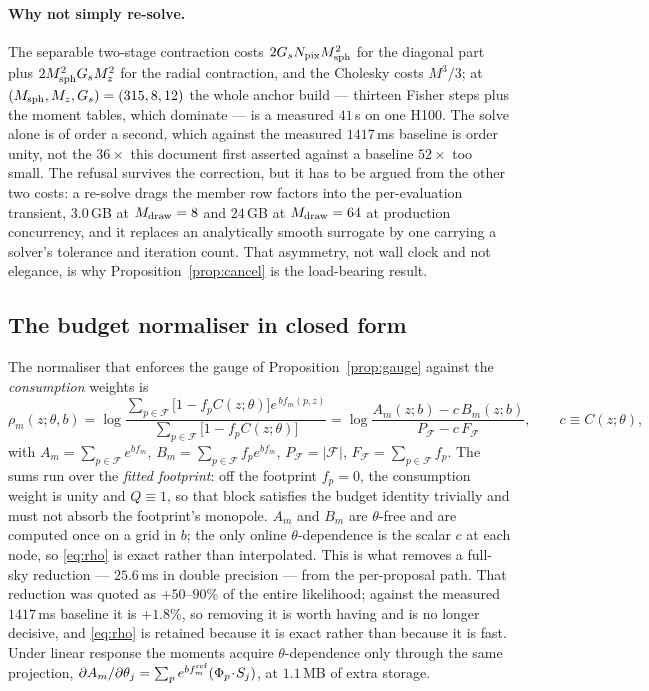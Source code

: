 \documentclass[11pt]{article}
\theoremstyle{definition}
\theoremstyle{remark}
\newcommand{\Mdraw}{M_{\rm draw}}
\newcommand{\Msph}{M_{\rm sph}}
\newcommand{\Mz}{M_{z}}
\newcommand{\Npix}{N_{\rm pix}}
\begin{document}
\paragraph{Why not simply re-solve.} The separable two-stage contraction costs
$2G_s\Npix\Msph^2$ for the diagonal part plus $2\Msph^2G_s\Mz^2$ for the radial
contraction, and the Cholesky costs $M^3/3$; at $(\Msph,\Mz,G_s)=(315,8,12)$ the
whole anchor build --- thirteen Fisher steps plus the moment tables, which
dominate --- is a measured $41$\,s on one H100. The solve alone is of order a
second, which against the measured $1417$\,ms baseline is order unity, not the
$36\times$ this document first asserted against a baseline $52\times$ too small.
The refusal survives the correction, but it has to be argued from the other two
costs: a re-solve drags the member row factors into the per-evaluation
transient, $3.0$\,GB at $\Mdraw=8$ and $24$\,GB at $\Mdraw=64$ at production
concurrency, and it replaces an analytically smooth surrogate by one carrying a
solver's tolerance and iteration count. That asymmetry, not wall clock and not
elegance, is why Proposition~\ref{prop:cancel} is the load-bearing result.

\subsection{The budget normaliser in closed form}

The normaliser that enforces the gauge of Proposition~\ref{prop:gauge} against the
\emph{consumption} weights is
\begin{equation}
  \rho_m(z;\theta,b)
  =\log\frac{\sum_{p\in\mathcal F}\big[1-f_pC(z;\theta)\big]e^{\,bf_m(p,z)}}
            {\sum_{p\in\mathcal F}\big[1-f_pC(z;\theta)\big]}
  =\log\frac{A_m(z;b)-c\,B_m(z;b)}{P_{\mathcal F}-c\,F_{\mathcal F}},
  \qquad c\equiv C(z;\theta),
  \label{eq:rho}
\end{equation}
with $A_m=\sum_{p\in\mathcal F}e^{bf_m}$, $B_m=\sum_{p\in\mathcal F}f_pe^{bf_m}$,
$P_{\mathcal F}=|\mathcal F|$, $F_{\mathcal F}=\sum_{p\in\mathcal F}f_p$. The sums run
over the \emph{fitted footprint}: off the footprint $f_p=0$, the consumption weight
is unity and $Q\equiv1$, so that block satisfies the budget identity trivially and
must not absorb the footprint's monopole. $A_m$ and $B_m$ are $\theta$-free and are
computed once on a grid in $b$; the only online $\theta$-dependence is the scalar
$c$ at each node, so \eqref{eq:rho} is exact rather than interpolated. This is what
removes a full-sky reduction --- $25.6$\,ms in double precision --- from the
per-proposal path. That reduction was quoted as $+50$--$90\%$ of the entire
likelihood; against the measured $1417$\,ms baseline it is $+1.8\%$, so removing
it is worth having and is no longer decisive, and \eqref{eq:rho} is retained
because it is exact rather than because it is fast. Under linear
response the moments acquire $\theta$-dependence only through the same projection,
$\partial A_m/\partial\theta_j=\sum_pe^{bf_m^{\rm ref}}(\Phi_p\!\cdot\!S_j)$, at
$1.1$\,MB of extra storage.
\end{document}
